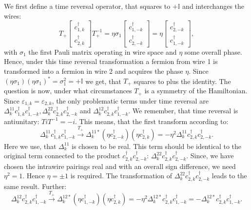 We first define a time reversal operator, that squares to $ + \mathbb{I}$ and interchanges the wires: 
\begin{equation}
T_+\begin{bmatrix} c^\dagger_{1,k} \\ c^\dagger_{2,k} \end{bmatrix} T_+^{-1} = \eta\sigma_1 \begin{bmatrix} c^\dagger_{1,-k} \\ c^\dagger_{2,-k} \end{bmatrix} = \eta\begin{bmatrix} c^\dagger_{2,-k} \\ c^\dagger_{1,-k} \end{bmatrix},\nonumber
\end{equation} 
with $\sigma_1$ the first Pauli matrix operating in wire space and $\eta$ some overall phase. Hence, under this time reversal transformation a fermion from wire 1 is transformed into a fermion in wire 2 and acquires the phase $\eta$. Since $(\eta\sigma_1)(\eta\sigma_1)^* = \sigma_1^2 = + \mathbb{I}$ we get, that $T_+$ squares to plus the identity. The question is now, under what circumstances $T_+$ is a symmetry of the Hamiltonian. Since $\varepsilon_{1,k} = \varepsilon_{2,k}$, the only problematic terms under time reversal are $\Delta^{11}_k c^\dagger_{1,k}c^\dagger_{1,-k}, \Delta^{22}_k c^\dagger_{2,k}c^\dagger_{2,-k}$ and $\Delta^{12}_kc^\dagger_{2,k}c^\dagger_{1,-k}$. We remember, that time reversal is antiunitary: $TiT^{-1} = -i$. This means, that the first transform according to:
\begin{equation}
\Delta^{11}_k c^\dagger_{1,k}c^\dagger_{1,-k} \overset{T_+}{\to} \Delta^{11*}_k \left(\eta c^\dagger_{2,-k}\right)\left(\eta c^\dagger_{2,k}\right) = -\eta^2\Delta^{11}_k c^\dagger_{2,k}c^\dagger_{2,-k}. \nonumber
\end{equation}
Here we use, that $\Delta^{11}_k$ is chosen to be real. This term should be identical to the original term connected to the product $c^\dagger_{2,k}c^\dagger_{2,-k}$: $\Delta^{22}_k c^\dagger_{2,k}c^\dagger_{2,-k}$. Since, we have chosen the intrawire pairings real and with an overall sign difference, we need $\eta^2 = 1$. Hence $\eta = \pm 1$ is required. The transformation of $\Delta^{22}_k c^\dagger_{2,k}c^\dagger_{2,-k}$ leads to the same result. Further:
\begin{equation}
\Delta^{12}_k c^\dagger_{2,k}c^\dagger_{1,-k} \overset{T_+}{\to} \Delta^{12*}_k \left(\eta c^\dagger_{1,-k}\right)\left( \eta c^\dagger_{2,k}\right) = -\eta^2 \Delta^{12*}_k c^\dagger_{2,k}c^\dagger_{1,-k} = - \Delta^{12*}_k c^\dagger_{2,k}c^\dagger_{1,-k}. \nonumber
\end{equation}
